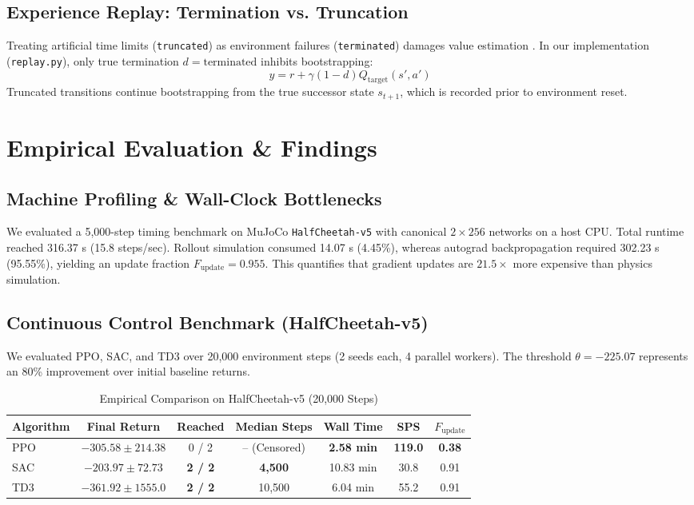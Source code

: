 \documentclass[10pt,journal,compsoc]{IEEEtran}
\begin{document}
\subsection{Experience Replay: Termination vs. Truncation}
Treating artificial time limits (\texttt{truncated}) as environment failures (\texttt{terminated}) damages value estimation \cite{pardo2018time}. In our implementation (\texttt{replay.py}), only true termination $d = \text{terminated}$ inhibits bootstrapping:
\begin{equation}
y = r + \gamma (1 - d) Q_{\text{target}}(s', a')
\end{equation}
Truncated transitions continue bootstrapping from the true successor state $s_{t+1}$, which is recorded prior to environment reset.

\section{Empirical Evaluation \& Findings}

\subsection{Machine Profiling \& Wall-Clock Bottlenecks}
We evaluated a 5,000-step timing benchmark on MuJoCo \texttt{HalfCheetah-v5} with canonical $2 \times 256$ networks on a host CPU. Total runtime reached 316.37 s (15.8 steps/sec). Rollout simulation consumed 14.07 s (4.45\%), whereas autograd backpropagation required 302.23 s (95.55\%), yielding an update fraction $F_{\text{update}} = 0.955$. This quantifies that gradient updates are $21.5\times$ more expensive than physics simulation.

\subsection{Continuous Control Benchmark (HalfCheetah-v5)}
We evaluated PPO, SAC, and TD3 over 20,000 environment steps (2 seeds each, 4 parallel workers). The threshold $\theta = -225.07$ represents an 80\% improvement over initial baseline returns.

\begin{table}[htbp]
\caption{Empirical Comparison on HalfCheetah-v5 (20,000 Steps)}
\label{tab:algos}
\centering
\begin{tabular}{lcccccc}
\toprule
\textbf{Algorithm} & \textbf{Final Return} & \textbf{Reached} & \textbf{Median Steps} & \textbf{Wall Time} & \textbf{SPS} & $F_{\text{update}}$ \\
\midrule
PPO & $-305.58 \pm 214.38$ & 0 / 2 & -- (Censored) & \textbf{2.58 min} & \textbf{119.0} & \textbf{0.38} \\
SAC & $\mathbf{-203.97 \pm 72.73}$ & \textbf{2 / 2} & \textbf{4,500} & 10.83 min & 30.8 & 0.91 \\
TD3 & $-361.92 \pm 1555.0$ & \textbf{2 / 2} & 10,500 & 6.04 min & 55.2 & 0.91 \\
\bottomrule
\end{tabular}
\end{table}
\end{document}
